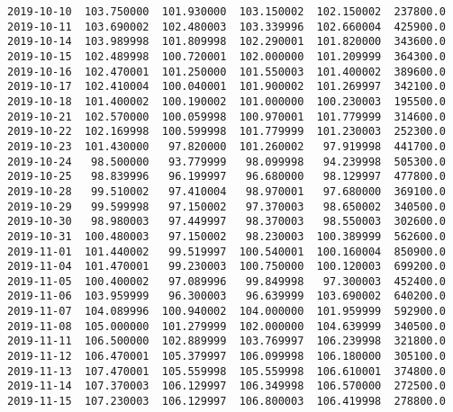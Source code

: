 \documentclass[11pt]{article}
\begin{document}
\begin{Verbatim}[commandchars=\\\{\}]
2019-10-10  103.750000  101.930000  103.150002  102.150002  237800.0   
2019-10-11  103.690002  102.480003  103.339996  102.660004  425900.0   
2019-10-14  103.989998  101.809998  102.290001  101.820000  343600.0   
2019-10-15  102.489998  100.720001  102.000000  101.209999  364300.0   
2019-10-16  102.470001  101.250000  101.550003  101.400002  389600.0   
2019-10-17  102.410004  100.040001  101.900002  101.269997  342100.0   
2019-10-18  101.400002  100.190002  101.000000  100.230003  195500.0   
2019-10-21  102.570000  100.059998  100.970001  101.779999  314600.0   
2019-10-22  102.169998  100.599998  101.779999  101.230003  252300.0   
2019-10-23  101.430000   97.820000  101.260002   97.919998  441700.0   
2019-10-24   98.500000   93.779999   98.099998   94.239998  505300.0   
2019-10-25   98.839996   96.199997   96.680000   98.129997  477800.0   
2019-10-28   99.510002   97.410004   98.970001   97.680000  369100.0   
2019-10-29   99.599998   97.150002   97.370003   98.650002  340500.0   
2019-10-30   98.980003   97.449997   98.370003   98.550003  302600.0   
2019-10-31  100.480003   97.150002   98.230003  100.389999  562600.0   
2019-11-01  101.440002   99.519997  100.540001  100.160004  850900.0   
2019-11-04  101.470001   99.230003  100.750000  100.120003  699200.0   
2019-11-05  100.400002   97.089996   99.849998   97.300003  452400.0   
2019-11-06  103.959999   96.300003   96.639999  103.690002  640200.0   
2019-11-07  104.089996  100.940002  104.000000  101.959999  592900.0   
2019-11-08  105.000000  101.279999  102.000000  104.639999  340500.0   
2019-11-11  106.500000  102.889999  103.769997  106.239998  321800.0   
2019-11-12  106.470001  105.379997  106.099998  106.180000  305100.0   
2019-11-13  107.470001  105.559998  105.559998  106.610001  374800.0   
2019-11-14  107.370003  106.129997  106.349998  106.570000  272500.0   
2019-11-15  107.230003  106.129997  106.800003  106.419998  278800.0   


\end{Verbatim}
\end{document}
